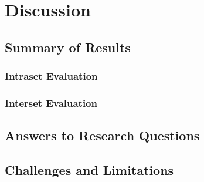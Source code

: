 \chapter{Discussion}
\label{ch:Discussion}


\section{Summary of Results}
\label{sec:Discussion:Summary}


\subsection{Intraset Evaluation}
\label{sec:Discussion:Intraset}

\subsection{Interset Evaluation}
\label{sec:Discussion:Interset}


\section{Answers to Research Questions}
\label{sec:Discussion:Answers}




\section{Challenges and Limitations}
\label{sec:Discussion:Challenges}




